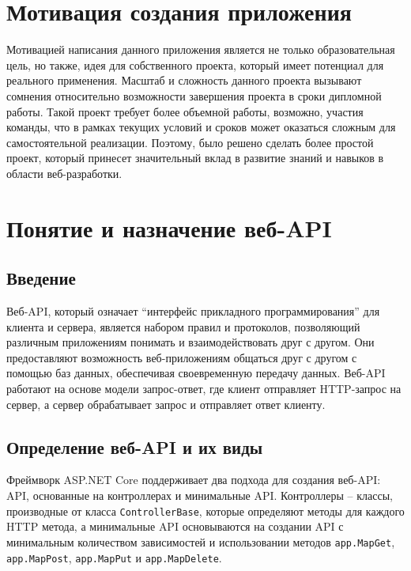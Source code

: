 \documentclass[a4paper,12pt]{report}
\begin{document}
\section{Мотивация создания приложения}

Мотивацией написания данного приложения является не только образовательная цель, но также, идея для собственного проекта, который
имеет потенциал для реального применения. Масштаб и сложность данного проекта вызывают сомнения относительно возможности завершения проекта в сроки 
дипломной работы. Такой проект требует более объемной работы, возможно, участия команды, что в рамках текущих условий и сроков может оказаться 
сложным для самостоятельной реализации. Поэтому, было решено сделать более простой проект, который принесет значительный вклад в развитие знаний и навыков 
в области веб-разработки.

\section{Понятие и назначение веб-\acs{API}}

\subsection{Введение}

Веб-\acs{API}, который означает “интерфейс прикладного программирования” для клиента и сервера, 
является набором правил и протоколов, позволяющий различным приложениям понимать и взаимодействовать 
друг с другом. Они предоставляют возможность веб-приложениям общаться друг с другом с помощью баз данных, 
обеспечивая своевременную передачу данных. Веб-\acs{API} работают на основе модели запрос-ответ, где клиент 
отправляет \acs{HTTP}-запрос  на сервер, а сервер обрабатывает запрос и отправляет ответ клиенту.

\subsection{Определение веб-\acs{API} и их виды}

Фреймворк ASP.NET Core поддерживает два подхода для создания веб-\acs{API}: \acs{API}, основанные на контроллерах 
и минимальные \acs{API}. Контроллеры -- классы, производные от класса \texttt{ControllerBase}, которые определяют методы 
для каждого \acs{HTTP} метода, а минимальные \acs{API} основываются на создании \acs{API} с минимальным количеством 
зависимостей и использовании методов \texttt{app.MapGet}, \texttt{app.MapPost}, \texttt{app.MapPut} и \texttt{app.MapDelete}.\cite{controller_vs_minimal_api}
\end{document}

